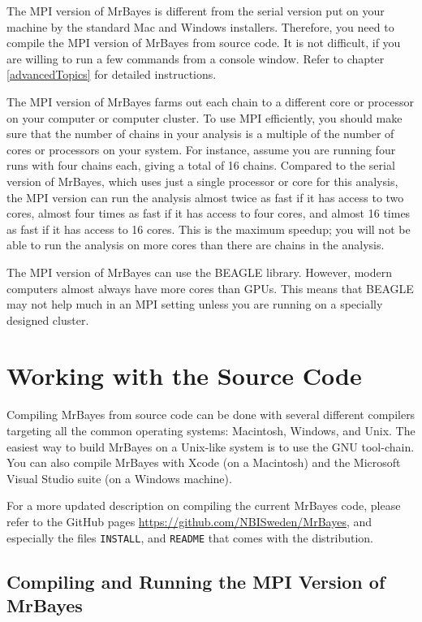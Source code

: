 \documentclass[12pt]{book}
\begin{document}
The MPI version of MrBayes is different from the serial version put on your machine by the standard
Mac and Windows installers. Therefore, you need to compile the MPI version of MrBayes from source
code. It is not difficult, if you are willing to run a few commands from a console window. Refer to
chapter \ref{advancedTopics} for detailed instructions.

The MPI version of MrBayes farms out each chain to a different core or processor on your computer
or computer cluster. To use MPI efficiently, you should make sure that the number of chains in your
analysis is a multiple of the number of cores or processors on your system. For instance, assume
you are running four runs with four chains each, giving a total of 16 chains. Compared to the
serial version of MrBayes, which uses just a single processor or core for this analysis, the MPI
version can run the analysis almost twice as fast if it has access to two cores, almost four times
as fast if it has access to four cores, and almost 16 times as fast if it has access to 16 cores.
This is the maximum speedup; you will not be able to run the analysis on more cores than there are
chains in the analysis.

The MPI version of MrBayes can use the BEAGLE library. However, modern computers almost always have
more cores than GPUs. This means that BEAGLE may not help much in an MPI setting unless you are
running on a specially designed cluster.

\section{Working with the Source Code}

Compiling MrBayes from source code can be done with several different compilers targeting all the
common operating systems: Macintosh, Windows, and Unix. The easiest way to build MrBayes on a
Unix-like system is to use the GNU tool-chain. You can also compile MrBayes with Xcode (on a
Macintosh) and the Microsoft Visual Studio suite (on a Windows machine).

For a more updated description on compiling the current MrBayes code, please refer to the GitHub
pages \url{https://github.com/NBISweden/MrBayes}, and especially the files \texttt{INSTALL}, and
\texttt{README} that comes with the distribution.

\subsection{Compiling and Running the MPI Version of MrBayes}
\label{MPIversion}
\end{document}
